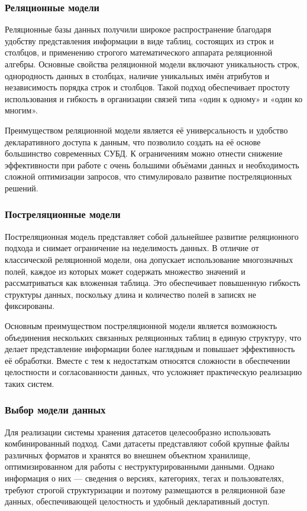 \subsubsection*{Реляционные модели}

Реляционные базы данных получили широкое распространение благодаря удобству представления информации в виде таблиц,
состоящих из строк и столбцов, и применению строгого математического аппарата реляционной алгебры.
Основные свойства реляционной модели включают уникальность строк, однородность данных в столбцах,
наличие уникальных имён атрибутов и независимость порядка строк и столбцов.
Такой подход обеспечивает простоту использования и гибкость в организации связей типа «один к одному» и «один ко многим».

Преимуществом реляционной модели является её универсальность и удобство декларативного доступа к данным,
что позволило создать на её основе большинство современных СУБД.
К ограничениям можно отнести снижение эффективности при работе с очень большими объёмами данных и необходимость
сложной оптимизации запросов, что стимулировало развитие постреляционных решений.~\cite{rel}

\subsubsection*{Постреляционные модели}

Постреляционная модель представляет собой дальнейшее развитие реляционного подхода и снимает ограничение на неделимость
данных.
В отличие от классической реляционной модели, она допускает использование многозначных полей,
каждое из которых может содержать множество значений и рассматриваться как вложенная таблица.
Это обеспечивает повышенную гибкость структуры данных, поскольку длина и количество полей в записях не фиксированы.

Основным преимуществом постреляционной модели является возможность объединения нескольких связанных реляционных таблиц
в единую структуру, что делает представление информации более наглядным и повышает эффективность её обработки.
Вместе с тем к недостаткам относятся сложности в обеспечении целостности и согласованности данных,
что усложняет практическую реализацию таких систем.~\cite{dorel}

\subsubsection*{Выбор модели данных}

Для реализации системы хранения датасетов целесообразно использовать комбинированный подход.
Сами датасеты представляют собой крупные файлы различных форматов и хранятся во внешнем объектном хранилище,
оптимизированном для работы с неструктурированными данными.
Однако информация о них --- сведения о версиях, категориях, тегах и пользователях, требуют строгой структуризации и
поэтому размещаются в реляционной базе данных, обеспечивающей целостность и удобный декларативный доступ.


